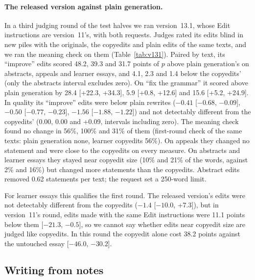 \documentclass[11pt]{article}
\newcommand{\shipver}{13.1}
\begin{document}
\paragraph{The released version against plain generation.} In a third judging round of the test halves we ran version~\shipver{}, whose Edit instructions are version~11's, with both requests. Judges rated its edits blind in new piles with the originals, the copyedits and plain edits of the same texts, and we ran the meaning check on them (Table~\ref{tab:v131}). Paired by text, its ``improve'' edits scored 48.2, 39.3 and 31.7 points of $p$ above plain generation's on abstracts, appeals and learner essays, and 4.1, 2.3 and 1.4 below the copyedits' (only the abstracts interval excludes zero). On ``fix the grammar'' it scored above plain generation by 28.4 [+22.3, +34.3], 5.9 [+0.8, +12.6] and 15.6 [+5.2, +24.9]. In quality its ``improve'' edits were below plain rewrites ($-0.41$ [$-0.68$, $-0.09$], $-0.50$ [$-0.77$, $-0.23$], $-1.56$ [$-1.88$, $-1.22$]) and not detectably different from the copyedits' (0.00, 0.00 and +0.09, intervals including zero). The meaning check found no change in 56\%, 100\% and 31\% of them (first-round check of the same texts: plain generation none, learner copyedits 56\%). On appeals they changed no statement and were close to the copyedits on every measure. On abstracts and learner essays they stayed near copyedit size (10\% and 21\% of the words, against 2\% and 16\%) but changed more statements than the copyedits. Abstract edits removed 0.62 statements per text; the request set a 250-word limit.

For learner essays this qualifies the first round. The released version's edits were not detectably different from the copyedits ($-1.4$ [$-10.0$, +7.3]), but in version~11's round, edits made with the same Edit instructions were 11.1 points below them [$-21.3$, $-0.5$], so we cannot say whether edits near copyedit size are judged like copyedits. In this round the copyedit alone cost 38.2 points against the untouched essay [$-46.0$, $-30.2$].

\subsection{Writing from notes}
\label{sec:write}
\end{document}
